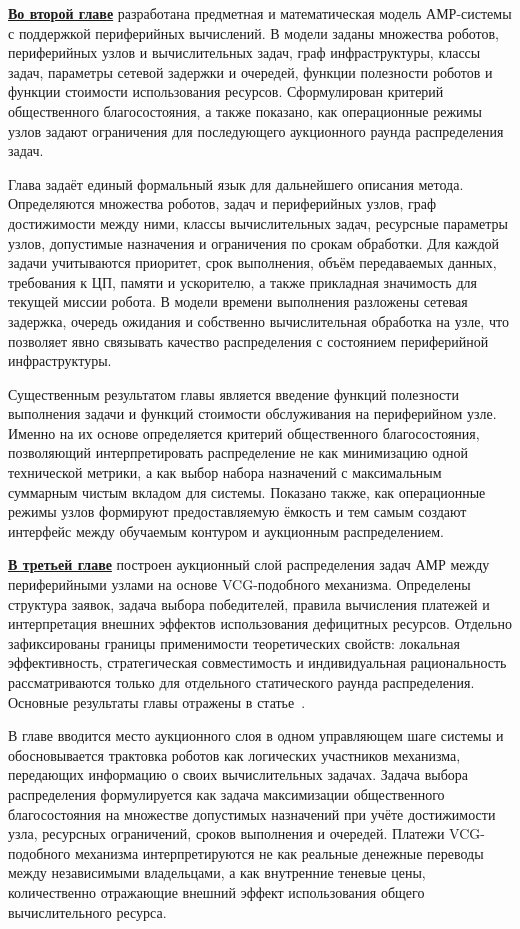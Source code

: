 \underline{\textbf{Во второй главе}} разработана предметная и математическая
модель АМР-системы с поддержкой периферийных вычислений. В модели заданы
множества роботов, периферийных узлов и вычислительных задач, граф
инфраструктуры, классы задач, параметры сетевой задержки и очередей,
функции полезности роботов и функции стоимости использования ресурсов.
Сформулирован критерий общественного благосостояния, а также показано, как
операционные режимы узлов задают ограничения для последующего аукционного
раунда распределения задач.

Глава задаёт единый формальный язык для дальнейшего описания метода.
Определяются множества роботов, задач и периферийных узлов, граф достижимости
между ними, классы вычислительных задач, ресурсные параметры узлов,
допустимые назначения и ограничения по срокам обработки. Для каждой задачи
учитываются приоритет, срок выполнения, объём передаваемых данных, требования к ЦП,
памяти и ускорителю, а также прикладная значимость для текущей миссии робота.
В модели времени выполнения разложены сетевая задержка, очередь ожидания и
собственно вычислительная обработка на узле, что позволяет явно связывать
качество распределения с состоянием периферийной инфраструктуры.

Существенным результатом главы является введение функций полезности
выполнения задачи и функций стоимости обслуживания на периферийном узле.
Именно на их основе определяется критерий общественного благосостояния,
позволяющий интерпретировать распределение не как минимизацию одной
технической метрики, а как выбор набора назначений с максимальным суммарным
чистым вкладом для системы. Показано также, как операционные режимы узлов
формируют предоставляемую ёмкость и тем самым создают интерфейс между
обучаемым контуром и аукционным распределением.

\underline{\textbf{В третьей главе}} построен аукционный слой распределения
задач АМР между периферийными узлами на основе VCG-подобного механизма.
Определены структура заявок, задача выбора победителей, правила вычисления
платежей и интерпретация внешних эффектов использования дефицитных ресурсов.
Отдельно зафиксированы границы применимости теоретических свойств: локальная
эффективность, стратегическая совместимость и индивидуальная рациональность
рассматриваются только для отдельного статического раунда распределения.
Основные результаты главы отражены в статье~\cite{Tereschenko2026MAVCG}.

В главе вводится место аукционного слоя в одном управляющем шаге системы и
обосновывается трактовка роботов как логических участников механизма,
передающих информацию о своих вычислительных задачах. Задача выбора
распределения формулируется как задача максимизации общественного
благосостояния на множестве допустимых назначений при учёте достижимости
узла, ресурсных ограничений, сроков выполнения и очередей. Платежи VCG-подобного
механизма интерпретируются не как реальные денежные переводы между
независимыми владельцами, а как внутренние теневые цены, количественно
отражающие внешний эффект использования общего вычислительного ресурса.

